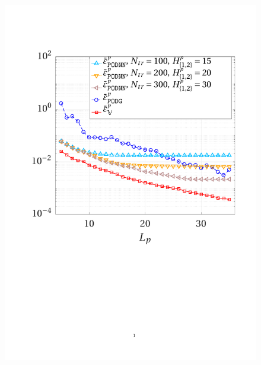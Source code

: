 \documentclass{elsarticle}
\numberwithin{equation}{section}
\theoremstyle{theorem}
\theoremstyle{definition}
\theoremstyle{remark}
\theoremstyle{proposition}
\numberwithin{figure}{section}
\begin{document}
\begin{figure}[t!]
			\includegraphics[scale = 0.38, trim = {2cm 9cm 1.5cm 3.5cm}, clip]{dc_200_p_error_vs_rank_ter} \\

\end{figure}
\end{document}
